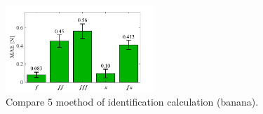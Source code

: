 \documentclass[a4paper]{jarticle}
\begin{document}
\begin{figure}[H]
    \centering
    \includegraphics[width=0.5\textwidth]{select_differet_q_banana.pdf}
    \captionsetup{width=0.9\linewidth} %
    \caption{Compare 5 moethod of identification calculation (banana).}
    \label{fig:compare_select5mode(banana)}
\end{figure}
\end{document}
